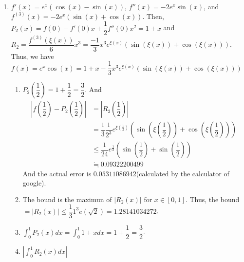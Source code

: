 \documentclass[12pt]{article}
\begin{document}
\begin{enumerate}
        \item $f'(x) = e^x(\cos(x) - \sin(x))$, $f''(x) = -2e^x\sin(x)$, and $f^{(3)}(x) = -2e^x(\sin(x) + \cos(x))$. 
        Then, $P_2(x) = f(0) + f'(0)x + \dfrac{1}{2} f''(0)x^2 = 1 + x$ and $R_2 = \dfrac{f^{(3)}(\xi(x))}{6}x^3 = \dfrac{-1}{3}x^3e^{\xi(x)}(\sin(\xi(x)) + \cos(\xi(x)))$.
        Thus, we have $f(x) = e^x\cos(x) = 1 + x - \dfrac{1}{3}x^3e^{\xi(x)}(\sin(\xi(x)) + \cos(\xi(x)))$
    \begin{enumerate}
        \item $P_2(\dfrac{1}{2}) = 1 + \dfrac{1}{2} = \dfrac{3}{2}$. And \begin{align*}
            |f(\dfrac{1}{2}) - P_2(\dfrac{1}{2})| &= |R_2(\dfrac{1}{2})|\\
            &= \dfrac{1}{3} \dfrac{1}{2^3} e^{\xi(\frac{1}{2})}(\sin(\xi(\dfrac{1}{2})) + \cos(\xi(\dfrac{1}{2})))\\
                &\leq \dfrac{1}{24} e^{\frac{1}{2}}(\sin(\dfrac{1}{2}) + \sin(\dfrac{1}{2}))\\
                &\fallingdotseq 0.09322200499
        \end{align*}
        And the actual error is $0.05311086942$(calculated by the calculator of google).

        \item The bound is the maximun of $|R_2(x)|$ for $x \in [0, 1]$.
        Thus, the bound$ = |R_2(x)| \leq \dfrac{1}{3} 1^3 e(\sqrt{2}) = 1.28141034272$.

        \item $\displaystyle\int_{0}^{1} P_2(x) dx = \displaystyle\int_{0}^{1} 1 + x dx = 1 + \dfrac{1}{2} = \dfrac{3}{2}$.
        
        \item $|\displaystyle\int_{0}^{1} R_2(x) dx| $
    \end{enumerate}
\end{enumerate}
\end{document}
